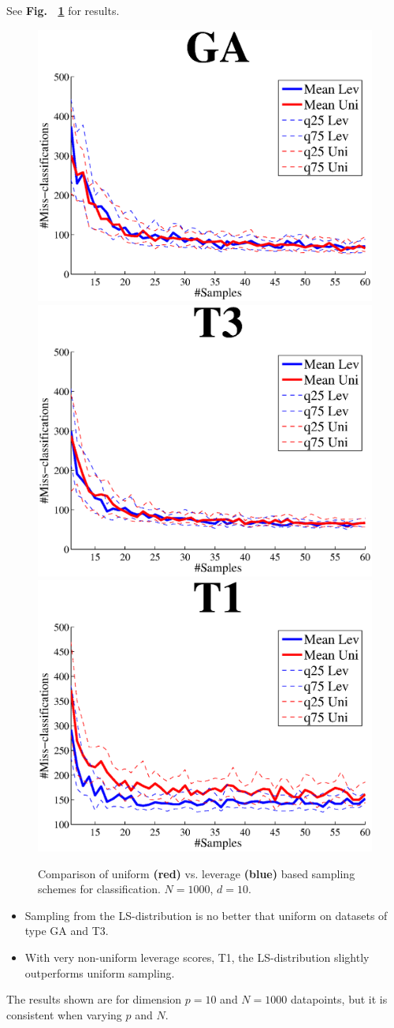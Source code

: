 \documentclass{article}
\begin{document}
See {\bf Fig.~ \ref{fig:LS_class}} for results.
\begin{figure}[t]
\centering
\includegraphics[width=.49\linewidth]{images/GA.eps}
\includegraphics[width=.49\linewidth]{images/T3.eps}
\includegraphics[width=.49\linewidth]{images/T1.eps}
\caption{Comparison of uniform {\bf\color{red}(red)} vs. leverage {\bf\color{blue}(blue)} based sampling schemes for classification. $N = 1000$, $d = 10$.}
\label{fig:LS_class}
\end{figure}	
\begin{itemize}
\item Sampling from the LS-distribution is no better that uniform on datasets of type GA and T3.
\item With very non-uniform leverage scores, T1, the LS-distribution slightly outperforms uniform sampling.
\end{itemize}
The results shown are for dimension $p = 10$ and $N = 1000$ datapoints, but it is consistent when varying $p$ and $N$. \\
%
\end{document}
